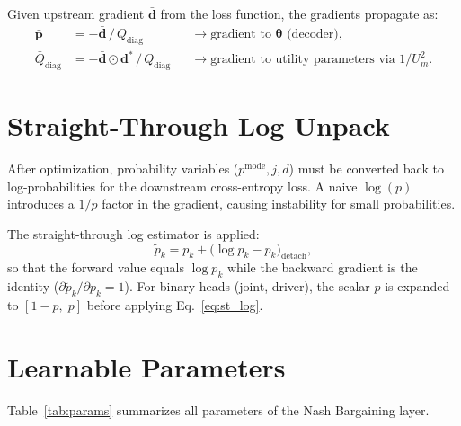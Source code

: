 \documentclass[11pt,a4paper]{article}
\newcommand{\thetapacked}{\boldsymbol{\theta}}
\begin{document}
Given upstream gradient $\bar{\mathbf{d}}$ from the loss function, the gradients propagate as:
\begin{align}
    \bar{\mathbf{p}} &= -\bar{\mathbf{d}} \,/\, Q_{\mathrm{diag}} & &\longrightarrow \text{gradient to } \thetapacked \text{ (decoder)}, \label{eq:grad_p} \\
    \bar{Q}_{\mathrm{diag}} &= -\bar{\mathbf{d}} \odot \mathbf{d}^* \,/\, Q_{\mathrm{diag}} & &\longrightarrow \text{gradient to utility parameters via } 1/U_m^2. \label{eq:grad_Q}
\end{align}


\section{Straight-Through Log Unpack}
\label{sec:st_log}

After optimization, probability variables ($p^{\mathrm{mode}}, j, d$) must be converted back to log-probabilities for the downstream cross-entropy loss.
A naive $\log(p)$ introduces a $1/p$ factor in the gradient, causing instability for small probabilities.

The straight-through log estimator is applied:
\begin{equation}
    \tilde{p}_k = p_k + \bigl(\log p_k - p_k\bigr)_{\mathrm{detach}},
    \label{eq:st_log}
\end{equation}
so that the forward value equals $\log p_k$ while the backward gradient is the identity ($\partial \tilde{p}_k / \partial p_k = 1$).
For binary heads (joint, driver), the scalar $p$ is expanded to $[1-p,\; p]$ before applying Eq.~\eqref{eq:st_log}.


\section{Learnable Parameters}
\label{sec:params}

Table~\ref{tab:params} summarizes all parameters of the Nash Bargaining layer.
\end{document}
